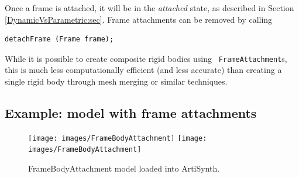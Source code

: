 Once a frame is attached, it
will be in the {\it attached} state, as described in Section
\ref{DynamicVsParametric:sec}.  Frame attachments can be removed by
calling
\begin{lstlisting}[]
  detachFrame (Frame frame);   
\end{lstlisting}
%

\begin{sideblock}
While it is possible to create composite rigid bodies using {\tt
FrameAttachment}s, this is much less computationally efficient (and
less accurate) than creating a single rigid body through mesh merging
or similar techniques.
\end{sideblock}

\subsection{Example: model with frame attachments}

\begin{figure}[ht]
\begin{center}
\iflatexml
 \texttt{[image: images/FrameBodyAttachment]}
\else
 \texttt{[image: images/FrameBodyAttachment]}
\fi
\end{center}
\caption{FrameBodyAttachment model loaded into ArtiSynth.}
\label{FrameBodyAttachment:fig}
\end{figure}

